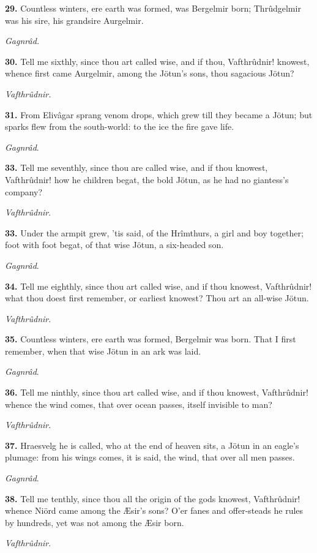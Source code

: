 \textbf{29.} Countless winters, ere earth was formed, was Bergelmir born;
Thrûdgelmir was his sire, his grandsire Aurgelmir.

\emph{Gagnrâd.}

\textbf{30.} Tell me sixthly, since thou art called wise, and if thou,
Vafthrûdnir! knowest, whence first came Aurgelmir, among the Jötun's
sons, thou sagacious Jötun?

\emph{Vafthrûdnir.}

\textbf{31.} From Elivâgar sprang venom drops, which grew till they became a
Jötun; but sparks flew from the south-world: to the ice the fire gave
life.

\emph{Gagnrâd}.

\textbf{33.} Tell me seventhly, since thou are called wise, and if thou
knowest, Vafthrûdnir! how he children begat, the bold Jötun, as he had
no giantess's company?

\emph{Vafthrûdnir}.

\textbf{33.} Under the armpit grew, 'tis said, of the Hrîmthurs, a girl and
boy together; foot with foot begat, of that wise Jötun, a six-headed
son.

\emph{Gagnrâd}.

\textbf{34.} Tell me eighthly, since thou art called wise, and if thou
knowest, Vafthrûdnir! what thou doest first remember, or earliest
knowest? Thou art an all-wise Jötun.

\emph{Vafthrûdnir}.

\textbf{35.} Countless winters, ere earth was formed, Bergelmir was born.
That I first remember, when that wise Jötun in an ark was laid.

\emph{Gagnrâd}.

\textbf{36.} Tell me ninthly, since thou art called wise, and if thou
knowest, Vafthrûdnir! whence the wind comes, that over ocean passes,
itself invisible to man?

\emph{Vafthrûdnir}.

\textbf{37.} Hraesvelg he is called, who at the end of heaven sits, a Jötun
in an eagle's plumage: from his wings comes, it is said, the wind,
that over all men passes.

\emph{Gagnrâd}.

\textbf{38.} Tell me tenthly, since thou all the origin of the gods knowest,
Vafthrûdnir! whence Niörd came among the Æsir's sons? O'er fanes and
offer-steads he rules by hundreds, yet was not among the Æsir born.

\emph{Vafthrûdnir}.

